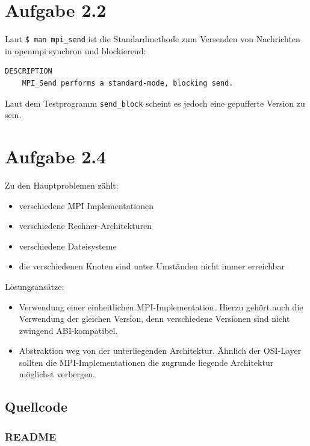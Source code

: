 \documentclass[a4paper,
12pt,
BCOR12mm,
]{scrartcl}
\begin{document}
\section*{Aufgabe 2.2}
Laut \verb|$ man mpi_send| ist die Standardmethode zum Versenden von Nachrichten in
openmpi synchron und blockierend:
\begin{verbatim}
DESCRIPTION
	MPI_Send performs a standard-mode, blocking send.
\end{verbatim}

Laut dem Testprogramm \verb|send_block| scheint es jedoch eine gepufferte Version zu sein.



\section*{Aufgabe 2.4}
Zu den Hauptproblemen zählt:
\begin{itemize}
	\item verschiedene MPI Implementationen
	\item verschiedene Rechner-Architekturen
	\item verschiedene Dateisysteme
	\item die verschiedenen Knoten sind unter Umständen nicht immer erreichbar
\end{itemize}

Lösungsansätze:
\begin{itemize}
	\item Verwendung einer einheitlichen MPI-Implementation. Hierzu gehört auch die
		Verwendung der gleichen Version, denn verschiedene Versionen sind nicht zwingend
		ABI-kompatibel.
	\item Abstraktion weg von der unterliegenden Architektur. Ähnlich der OSI-Layer sollten
	die MPI-Implementationen die zugrunde liegende Architektur möglichst verbergen.
\end{itemize}

\nocite{*}

%
\newpage
\subsection*{Quellcode}
\subsubsection*{README}

\newpage
\end{document}
